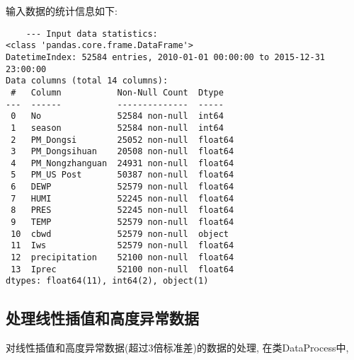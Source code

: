 输入数据的统计信息如下:
\begin{lstlisting}
    --- Input data statistics:
<class 'pandas.core.frame.DataFrame'>
DatetimeIndex: 52584 entries, 2010-01-01 00:00:00 to 2015-12-31 23:00:00
Data columns (total 14 columns):
 #   Column           Non-Null Count  Dtype
---  ------           --------------  -----
 0   No               52584 non-null  int64
 1   season           52584 non-null  int64
 2   PM_Dongsi        25052 non-null  float64
 3   PM_Dongsihuan    20508 non-null  float64
 4   PM_Nongzhanguan  24931 non-null  float64
 5   PM_US Post       50387 non-null  float64
 6   DEWP             52579 non-null  float64
 7   HUMI             52245 non-null  float64
 8   PRES             52245 non-null  float64
 9   TEMP             52579 non-null  float64
 10  cbwd             52579 non-null  object
 11  Iws              52579 non-null  float64
 12  precipitation    52100 non-null  float64
 13  Iprec            52100 non-null  float64
dtypes: float64(11), int64(2), object(1)
\end{lstlisting}

\subsection{处理线性插值和高度异常数据}

对线性插值和高度异常数据(超过3倍标准差)的数据的处理, 在类DataProcess中, 